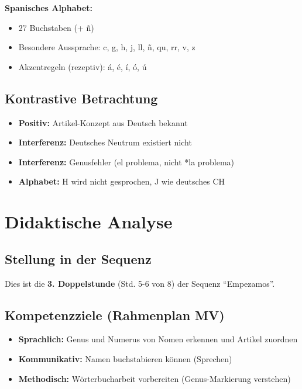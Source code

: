 \documentclass[11pt,a4paper]{article}
\newcommand{\reihenthema}{Empezamos}
\begin{document}
\textbf{Spanisches Alphabet:}
\begin{itemize}
    \item 27 Buchstaben (+ ñ)
    \item Besondere Aussprache: c, g, h, j, ll, ñ, qu, rr, v, z
    \item Akzentregeln (rezeptiv): á, é, í, ó, ú
\end{itemize}

\subsection{Kontrastive Betrachtung}
\begin{itemize}
    \item \textbf{Positiv:} Artikel-Konzept aus Deutsch bekannt
    \item \textbf{Interferenz:} Deutsches Neutrum existiert nicht
    \item \textbf{Interferenz:} Genusfehler (el problema, nicht *la problema)
    \item \textbf{Alphabet:} H wird nicht gesprochen, J wie deutsches CH
\end{itemize}

\section{Didaktische Analyse}

\subsection{Stellung in der Sequenz}
Dies ist die \textbf{3. Doppelstunde} (Std. 5-6 von 8) der Sequenz ``\reihenthema''.

\subsection{Kompetenzziele (Rahmenplan MV)}
\begin{itemize}
    \item \textbf{Sprachlich:} Genus und Numerus von Nomen erkennen und Artikel zuordnen
    \item \textbf{Kommunikativ:} Namen buchstabieren können (Sprechen)
    \item \textbf{Methodisch:} Wörterbucharbeit vorbereiten (Genus-Markierung verstehen)
\end{itemize}
\end{document}
